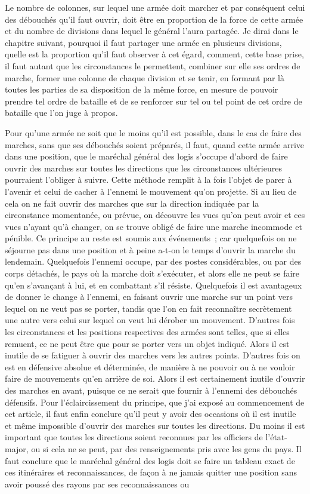 \documentclass[french,twoside]{book} %
\begin{document}
Le nombre de colonnes, sur lequel une armée doit marcher et par conséquent celui des débouchés qu’il faut ouvrir, doit être en proportion de la force de cette armée et du nombre de divisions dans lequel le général l’aura partagée. Je dirai dans le chapitre suivant, pourquoi il faut partager une armée en plusieurs divisions, quelle est la proportion qu’il faut observer à cet égard, comment, cette base prise, il faut autant que les circonstances le permettent, combiner sur elle ses ordres de marche, former une colonne de chaque division et se tenir, en formant par là toutes les parties de sa disposition de la même force, en mesure de pouvoir prendre tel ordre de bataille et de se renforcer sur tel ou tel point de cet ordre de bataille que l’on juge à propos.\par
Pour qu’une armée ne soit que le moins qu’il est possible, dans le cas de faire des marches, sans que ses débouchés soient préparés, il faut, quand cette armée arrive dans une position, que le maréchal général des logis s’occupe d’abord de faire ouvrir des marches sur toutes les directions que les circonstances ultérieures pourraient l’obliger à suivre. Cette méthode remplit à la fois l’objet de parer à l’avenir et celui de cacher à l’ennemi le mouvement qu’on projette. Si au lieu de cela on ne fait ouvrir des marches que sur la direction indiquée par la circonstance momentanée, ou prévue, on découvre les vues qu’on peut avoir et ces vues n’ayant qu’à changer, on se trouve obligé de faire une marche incommode et pénible. Ce principe au reste est soumis aux événements ; car quelquefois on ne séjourne pas dans une position et à peine a-t-on le temps d’ouvrir la marche du lendemain. Quelquefois l’ennemi occupe, par des postes considérables, ou par des corps détachés, le pays où la marche doit s’exécuter, et alors elle ne peut se faire qu’en s’avançant à lui, et en combattant s’il résiste. Quelquefois il est avantageux de donner le change à l’ennemi, en faisant ouvrir une marche sur un point vers lequel on ne veut pas se porter, tandis que l’on en fait reconnaître secrètement une autre vers celui sur lequel on veut lui dérober un mouvement. D’autres fois les circonstances et les positions respectives des armées sont telles, que si elles remuent, ce ne peut être que pour se porter vers un objet indiqué. Alors il est inutile de se fatiguer à ouvrir des marches vers les autres points. D’autres fois on est en défensive absolue et déterminée, de manière à ne pouvoir ou à ne vouloir faire de mouvements qu’en arrière de soi. Alors il est certainement inutile d’ouvrir des marches en avant, puisque ce ne serait que fournir à l’ennemi des débouchés défensifs. Pour l’éclaircissement du principe, que j’ai exposé au commencement de cet article, il faut enfin conclure qu’il peut y avoir des occasions où il est inutile et même impossible d’ouvrir des marches sur toutes les directions. Du moins il est important que toutes les directions soient reconnues par les officiers de l’état-major, ou si cela ne se peut, par des renseignements pris avec les gens du pays. Il faut conclure que le maréchal général des logis doit se faire un tableau exact de ces itinéraires et reconnaissances, de façon à ne jamais quitter une position sans avoir poussé des rayons par ses reconnaissances ou 
\end{document}
